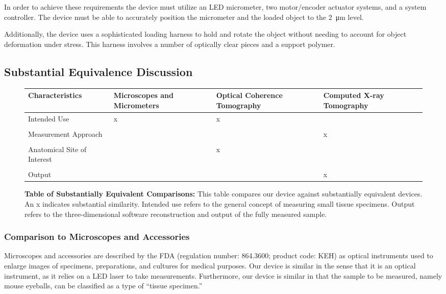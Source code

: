\documentclass{article}
\begin{document}
In order to achieve these requirements the device must utilize an LED
micrometer, two motor/encoder actuator systems, and a system
controller. The device must be able to accurately position the
micrometer and the loaded object to the \SI{2}{\micro m} level.

Additionally, the device uses a sophisticated loading harness to hold
and rotate the object without needing to account for object
deformation under stress. This harness involves a number of optically
clear pieces and a support polymer.

\newpage
\subsection{Substantial Equivalence Discussion}

\begin{figure}[H]
  \begin{tabularx}{\textwidth}{YYYY}
    \toprule
    Characteristics & \mbox{Microscopes} and \mbox{Micrometers} & Optical Coherence \mbox{Tomography} & Computed X-ray \mbox{Tomography} \\ 
    \hline
    Intended Use & x & x &  \\
    \\
    Measurement Approach &   &  & x \\ 
    \\
    Anatomical Site of Interest & & x &  \\
    \\
    Output & & & x \\
    \bottomrule
  \end{tabularx}
  \caption{\textbf{Table of Substantially Equivalent Comparisons:}
    This table compares our device against substantially equivalent
    devices. An x indicates substantial similarity. Intended use
    refers to the general concept of measuring small tissue
    specimens. Output refers to the three-dimensional software
    reconstruction and output of the fully measured sample.}
  \label{comparison}
\end{figure}

\subsubsection{Comparison to Microscopes and Accessories}
Microscopes and accessories are described by the FDA (regulation
number: 864.3600; product code: KEH) as optical instruments used to
enlarge images of specimens, preparations, and cultures for medical
purposes. Our device is similar in the sense that it is an optical
instrument, as it relies on a LED laser to take
measurements. Furthermore, our device is similar in that the sample to
be measured, namely mouse eyeballs, can be classified as a type of
``tissue specimen.''
\end{document}
